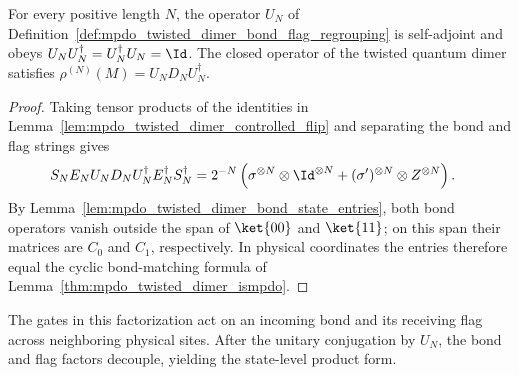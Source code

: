 \begin{lemma}%
    \label{thm:mpdo_twisted_dimer_unitary_factorization}
    \leanok
    For every positive length $N$, the operator $U_N$ of
    Definition~\ref{def:mpdo_twisted_dimer_bond_flag_regrouping} is
    self-adjoint and obeys $U_NU_N^\dagger=U_N^\dagger U_N=\Id$.
    The closed operator of the twisted quantum dimer satisfies
    $\rho^{(N)}(M)=U_ND_NU_N^\dagger$.
\end{lemma}
\begin{proof}\leanok
    Taking tensor products of the identities in
    Lemma~\ref{lem:mpdo_twisted_dimer_controlled_flip} and separating
    the bond and flag strings gives
    \begin{align}
        S_NE_NU_ND_NU_N^\dagger E_N^\dagger S_N^\dagger
         & =2^{-N}\left(\sigma^{\otimes N}\otimes\Id^{\otimes N}
        +(\sigma')^{\otimes N}\otimes Z^{\otimes N}\right).
        \notag
    \end{align}
    By Lemma~\ref{lem:mpdo_twisted_dimer_bond_state_entries}, both bond
    operators vanish outside the span of $\ket{00}$ and
    $\ket{11}$; on this span their matrices are $C_0$ and $C_1$,
    respectively. In physical coordinates the entries therefore equal
    the cyclic bond-matching formula of
    Lemma~\ref{thm:mpdo_twisted_dimer_ismpdo}.
\end{proof}

The gates in this factorization act on an incoming bond and its receiving
flag across neighboring physical sites. After the unitary conjugation by $U_N$,
the bond and flag factors decouple, yielding the state-level product form.

